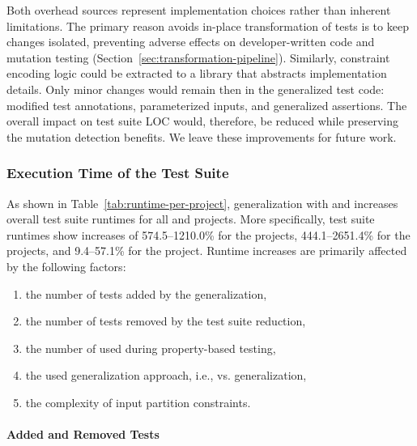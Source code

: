 Both overhead sources represent implementation choices rather than inherent limitations.
The primary reason \ToolTeralizer{} avoids in-place transformation of tests
is to keep changes isolated,
preventing adverse effects on developer-written code
and mutation testing (Section~\ref{sec:transformation-pipeline}).
Similarly, constraint encoding logic could be extracted to a library
that abstracts implementation details.
Only minor changes would remain then in the generalized test code:
modified test annotations, parameterized inputs, and generalized assertions.
The overall impact on test suite LOC would, therefore, be reduced
while preserving the mutation detection benefits.
We leave these improvements for future work.

\subsubsection{Execution Time of the Test Suite}
\label{sec:test-suite-execution-time}

As shown in Table~\ref{tab:runtime-per-project},
generalization with \VariantNaiveC{} and \VariantImprovedC{}
increases overall test suite runtimes
for all \DatasetsEqBenchEs{} and \DatasetsCommonsEs{} projects.
More specifically, test suite runtimes
show increases of 574.5--1210.0\% for the \DatasetsEqBenchEs{} projects,
444.1--2651.4\% for the \DatasetsCommonsEs{} projects,
and 9.4--57.1\% for the \DatasetCommonsDev{} project.
Runtime increases are primarily affected by the following factors:

\begin{enumerate}
  \item the number of tests added by the generalization,
  \item the number of tests removed by the test suite reduction,
  \item the number of \tries{} used during property-based testing,
  \item the used generalization approach, i.e., \VariantNaive{} vs. \VariantImproved{} generalization,
  \item the complexity of input partition constraints.
\end{enumerate}



\paragraph{Added and Removed Tests}

